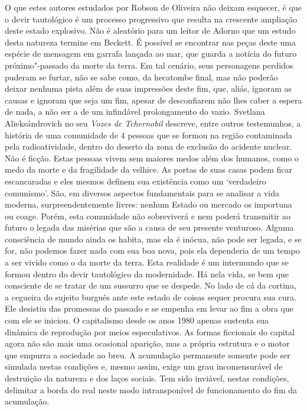 O que estes autores estudados por Robson de Oliveira não deixam
esquecer, é que o devir tautológico é um processo progressivo que
resulta na crescente ampliação deste estado explosivo. Não é aleatório
para um leitor de Adorno que um estudo desta natureza termine em
Beckett. É possível se encontrar nas peças deste uma espécie de mensagem
em garrafa lançada ao mar, que guarda a notícia do futuro
próximo"-passado da morte da terra. Em tal cenário, seus personagens
perdidos puderam se furtar, não se sabe como, da hecatombe final, mas
não poderão deixar nenhuma pista além de suas impressões deste fim, que,
aliás, ignoram as causas e ignoram que seja um fim, apesar de
desconfiarem não lhes caber a espera de nada, a não ser a de um
infindável prolongamento do vazio. Svetlana Alieksándrovich no seu
\emph{Vozes de Tchernobil} descreve, entre outros testemunhos, a
história de uma comunidade de 4 pessoas que se formou na região
contaminada pela radioatividade, dentro do deserto da zona de exclusão
do acidente nuclear. Não é ficção. Estas pessoas vivem sem maiores medos
além dos humanos, como o medo da morte e da fragilidade da velhice. As
portas de suas casas podem ficar escancaradas e eles mesmos definem sua
existência como um `verdadeiro comunismo'. São, em diversos aspectos
fundamentais para se analisar a vida moderna, surpreendentemente livres:
nenhum Estado ou mercado os importuna ou coage. Porém, esta comunidade
não sobreviverá e nem poderá transmitir ao futuro o legada das misérias
que são a causa de seu presente venturoso. Alguma consciência de mundo
ainda os habita, mas ela é inócua, não pode ser legada, e se for, não
podemos fazer nada com sua boa nova, pois ela dependeria de um tempo a
ser vivido como o da morte da terra. Esta realidade é um intermundo que
se formou dentro do devir tautológico da modernidade. Há nela vida, se
bem que consciente de se tratar de um sussurro que se despede. No lado
de cá da cortina, a cegueira do sujeito burguês ante este estado de
coisas sequer procura sua cura. Ele desistiu das promessas do passado e
se empenha em levar ao fim a obra que com ele se iniciou. O capitalismo
desde os anos 1980 apenas sustenta sua dinâmica de reprodução por meios
especulativos. As formas ficcionais do capital agora não são mais uma
ocasional aparição, mas a própria estrutura e o motor que empurra a
sociedade ao breu. A acumulação permanente somente pode ser simulada
nestas condições e, mesmo assim, exige um grau incomensurável de
destruição da natureza e dos laços sociais. Tem sido inviável, nestas
condições, delimitar a borda do real neste modo intransponível de
funcionamento do fim da acumulação.

